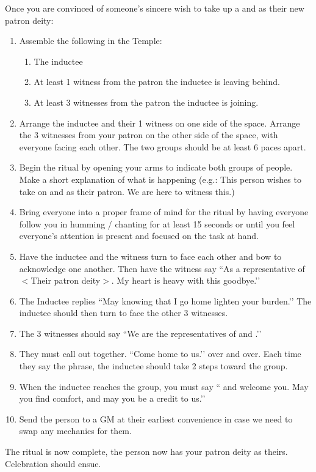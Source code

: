 \documentclass[green]{GL2020}
\begin{document}
Once you are convinced of someone’s sincere wish to take up a \cEbb{} and \cFlow{} as their new patron deity:
  \begin{enumerate}
    \item Assemble the following in the Temple:
    \begin{enumerate}
      \item The inductee
      \item At least 1 witness from the patron the inductee is leaving behind.
      \item At least 3 witnesses from the patron the inductee is joining.
    \end{enumerate}
    \item Arrange the inductee and their 1 witness on one side of the space. Arrange the 3 witnesses from your patron on the other side of the space, with everyone facing each other. The two groups should be at least 6 paces apart.
    \item Begin the ritual by opening your arms to indicate both groups of people. Make a short explanation of what is happening (e.g.: This person wishes to take on \cEbb{} and \cFlow{} as their patron. We are here to witness this.)
    \item Bring everyone into a proper frame of mind for the ritual by having everyone follow you in humming / chanting for at least 15 seconds or until you feel everyone’s attention is present and focused on the task at hand.
    \item Have the inductee and the witness turn to face each other and bow to acknowledge one another. Then have the witness say ``As a representative of $<$Their patron deity$>$. My heart is heavy with this goodbye.’’
    \item The Inductee replies ``May knowing that I go home lighten your burden.’’ The inductee should then turn to face the other 3 witnesses.
    \item The 3 witnesses should say ``We are the representatives of \cEbb{} and \cFlow{}.’’
    \item They must call out together. ``Come home to us.’’ over and over. Each time they say the phrase, the inductee should take 2 steps toward the group.
    \item When the inductee reaches the group, you must say ``\cEbb{} and \cFlow{} welcome you. May you find comfort, and may you be a credit to us.’’
    \item Send the person to a GM at their earliest convenience in case we need to swap any mechanics for them.
  \end{enumerate}
The ritual is now complete, the person now has your patron deity as theirs. Celebration should ensue.
   
\end{document}
